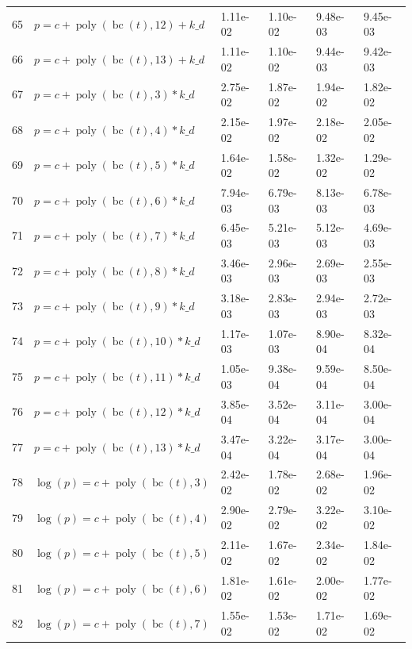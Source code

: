 \documentclass[12pt,a4paper]{article}
\DeclareMathOperator{\bc}{bc}
\DeclareMathOperator{\poly}{poly}
\begin{document}
\begin{longtable}[t]{ll>{\raggedleft\arraybackslash}p{2cm}>{\raggedleft\arraybackslash}p{2cm}>{\raggedleft\arraybackslash}p{2cm}>{\raggedleft\arraybackslash}p{2cm}}
\rowcolor{gray!6}  65 & $p = c + \poly\left( \bc(t), 12 \right) + k\_d$ & 1.11e-02 & 1.10e-02 & 9.48e-03 & 9.45e-03\\
66 & $p = c + \poly\left( \bc(t), 13 \right) + k\_d$ & 1.11e-02 & 1.10e-02 & 9.44e-03 & 9.42e-03\\
\rowcolor{gray!6}  67 & $p = c + \poly\left( \bc(t), 3 \right) * k\_d$ & 2.75e-02 & 1.87e-02 & 1.94e-02 & 1.82e-02\\
68 & $p = c + \poly\left( \bc(t), 4 \right) * k\_d$ & 2.15e-02 & 1.97e-02 & 2.18e-02 & 2.05e-02\\
\rowcolor{gray!6}  69 & $p = c + \poly\left( \bc(t), 5 \right) * k\_d$ & 1.64e-02 & 1.58e-02 & 1.32e-02 & 1.29e-02\\
70 & $p = c + \poly\left( \bc(t), 6 \right) * k\_d$ & 7.94e-03 & 6.79e-03 & 8.13e-03 & 6.78e-03\\
\rowcolor{gray!6}  71 & $p = c + \poly\left( \bc(t), 7 \right) * k\_d$ & 6.45e-03 & 5.21e-03 & 5.12e-03 & 4.69e-03\\
72 & $p = c + \poly\left( \bc(t), 8 \right) * k\_d$ & 3.46e-03 & 2.96e-03 & 2.69e-03 & 2.55e-03\\
\rowcolor{gray!6}  73 & $p = c + \poly\left( \bc(t), 9 \right) * k\_d$ & 3.18e-03 & 2.83e-03 & 2.94e-03 & 2.72e-03\\
74 & $p = c + \poly\left( \bc(t), 10 \right) * k\_d$ & 1.17e-03 & 1.07e-03 & 8.90e-04 & 8.32e-04\\
\rowcolor{gray!6}  75 & $p = c + \poly\left( \bc(t), 11 \right) * k\_d$ & 1.05e-03 & 9.38e-04 & 9.59e-04 & 8.50e-04\\
76 & $p = c + \poly\left( \bc(t), 12 \right) * k\_d$ & 3.85e-04 & 3.52e-04 & 3.11e-04 & 3.00e-04\\
\rowcolor{gray!6}  77 & $p = c + \poly\left( \bc(t), 13 \right) * k\_d$ & 3.47e-04 & 3.22e-04 & 3.17e-04 & 3.00e-04\\
78 & $\log(p) = c + \poly\left( \bc(t), 3 \right)$ & 2.42e-02 & 1.78e-02 & 2.68e-02 & 1.96e-02\\
\rowcolor{gray!6}  79 & $\log(p) = c + \poly\left( \bc(t), 4 \right)$ & 2.90e-02 & 2.79e-02 & 3.22e-02 & 3.10e-02\\
80 & $\log(p) = c + \poly\left( \bc(t), 5 \right)$ & 2.11e-02 & 1.67e-02 & 2.34e-02 & 1.84e-02\\
\rowcolor{gray!6}  81 & $\log(p) = c + \poly\left( \bc(t), 6 \right)$ & 1.81e-02 & 1.61e-02 & 2.00e-02 & 1.77e-02\\
82 & $\log(p) = c + \poly\left( \bc(t), 7 \right)$ & 1.55e-02 & 1.53e-02 & 1.71e-02 & 1.69e-02\\

\end{longtable}
\end{document}
